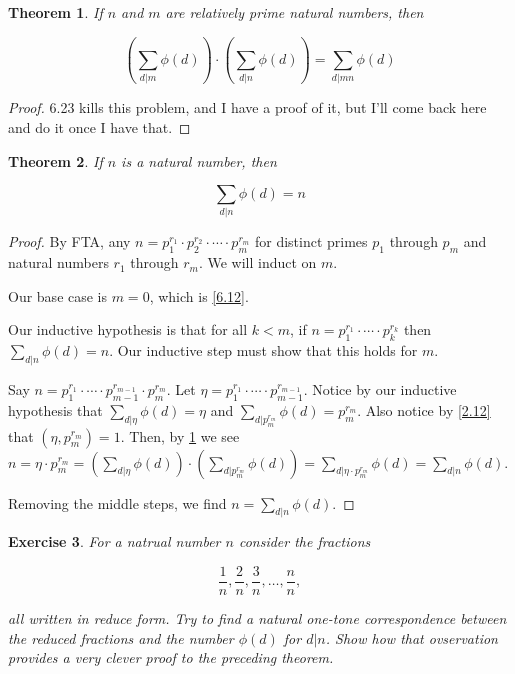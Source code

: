\documentclass{article}
\newtheorem{thm}{Theorem}[section]
\newtheorem{ex}[thm]{Exercise}
\numberwithin{equation}{thm}
\begin{document}
\begin{thm} \label{6.14}
  If $n$ and $m$ are relatively prime natural numbers, then

  $$\left( \sum_{d|m} \phi(d) \right) \cdot \left( \sum_{d|n} \phi(d) \right) = \sum_{d|mn} \phi(d)$$
\end{thm}

\begin{proof}
  6.23 kills this problem, and I have a proof of it, but I'll come back here and do it once I have that.
\end{proof}



\begin{thm} \label{6.15}
  If $n$ is a natural number, then

  $$\sum_{d|n} \phi(d) = n$$
\end{thm}

\begin{proof}
  By FTA, any $n = p_1^{r_1} \cdot p_2^{r_2} \cdot \cdots \cdot p_m^{r_m}$ for distinct primes $p_1$ through $p_m$ and natural numbers $r_1$ through $r_m$. We will induct on $m$.

  Our base case is $m = 0$, which is \ref{6.12}.

  Our inductive hypothesis is that for all $k < m$, if $n = p_1^{r_1} \cdot \cdots \cdot p_k^{r_k}$ then $\sum_{d|n} \phi(d) = n$. Our inductive step must show that this holds for $m$.

  Say $n = p_1^{r_1} \cdot \cdots \cdot p_{m-1}^{r_{m-1}} \cdot p_m^{r_m}$. Let $\eta = p_1^{r_1} \cdot \cdots \cdot p_{m-1}^{r_{m-1}}$. Notice by our inductive hypothesis that $\sum_{d|\eta} \phi(d) = \eta$ and $\sum_{d|p_m^{r_m}} \phi(d) = p_m^{r_m}$.
  Also notice by \ref{2.12} that $(\eta, p_m^{r_m}) = 1$. Then, by \ref{6.14} we see $n = \eta \cdot p_m^{r_m} = \left( \sum_{d|\eta} \phi(d) \right) \cdot \left( \sum_{d|p_m^{r_m}} \phi(d) \right) = \sum_{d|\eta \cdot p_m^{r_m}} \phi(d) = \sum_{d|n} \phi(d)$.

  Removing the middle steps, we find $n = \sum_{d|n} \phi(d)$.
\end{proof}



\begin{ex} \label{6.16}
  For a natrual number $n$ consider the fractions

  $$\frac{1}{n}, \frac{2}{n}, \frac{3}{n}, \ldots, \frac{n}{n},$$

  all written in reduce form. Try to find a natural one-tone correspondence between the reduced fractions and the number $\phi(d)$ for $d | n$. Show how that ovservation provides a very clever proof to the preceding theorem.
\end{ex}
\end{document}
